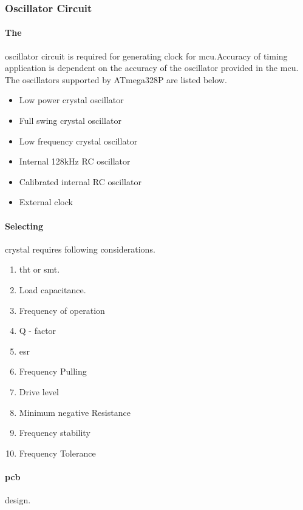 

\subsubsection{Oscillator Circuit}

	\paragraph{The} oscillator circuit is required for generating clock for \gls{mcu}.Accuracy of timing application is dependent on the accuracy of the oscillator provided in the \gls{mcu}. The oscillators supported by ATmega328P are listed below.
		\begin{itemize}
			\item Low power crystal oscillator
			\item Full swing crystal oscillator
			\item Low frequency crystal oscillator
			\item Internal 128kHz RC oscillator
			\item Calibrated internal RC oscillator
			\item External clock
		\end{itemize}		
		
	\paragraph{Selecting} crystal requires following considerations.
		\begin{enumerate}
				\item \gls{tht} or \gls{smt}.
				\item Load capacitance.
				\item Frequency of operation
				\item Q - factor
				\item \gls{esr}
				\item Frequency Pulling
				\item Drive level
				\item Minimum negative Resistance
				\item Frequency stability
				\item Frequency Tolerance
		\end{enumerate}
			
	\paragraph{\gls{pcb} } design.
	

\cite{AVR042}

